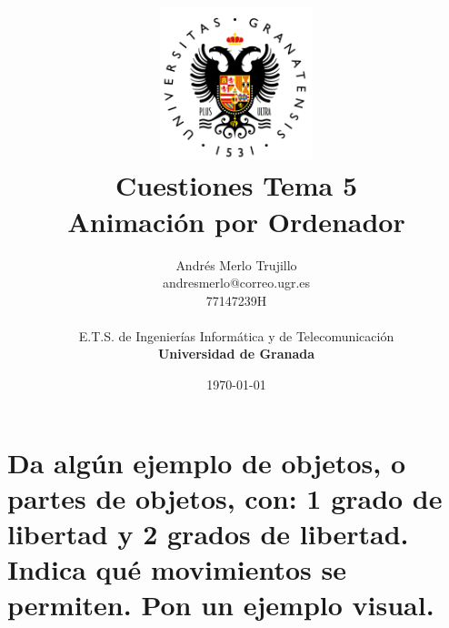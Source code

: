 \documentclass{article}
\title{
\includegraphics[width=1.75in]{imagenes/UGR-Logo.png} \\
\vspace*{1in}
\textbf{Cuestiones Tema 5} \\
Animación por Ordenador \\
\vspace*{0.5in}}
\author{Andrés Merlo Trujillo \\
andresmerlo@correo.ugr.es \\
77147239H \\ 
\vspace*{0.5in} \\
E.T.S. de Ingenierías Informática y de Telecomunicación \\
\textbf{Universidad de Granada}} \date{\today}
\begin{document}
\begin{titlingpage}
\maketitle
\end{titlingpage}

\tableofcontents

\newpage

\pagestyle{fancy}   %


\section{Da algún ejemplo de objetos, o partes de objetos, con: 1 grado de libertad y 2 grados de libertad. Indica qué movimientos se permiten. Pon un ejemplo visual.}
\end{document}
